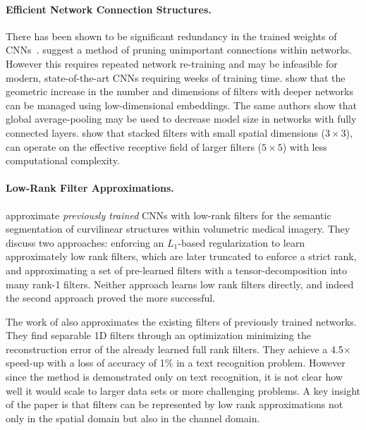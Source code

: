 \documentclass[thesis]{subfiles}
\begin{document}
    \paragraph{Efficient Network Connection Structures.}
    There has been shown to be significant redundancy in the trained weights of CNNs~\citep{Denil2013predicting}. \citet{lecun1989optimal} suggest a method of pruning unimportant connections within networks. However this requires repeated network re-training and may be infeasible for modern, state-of-the-art CNNs requiring weeks of training time. \citet{Lin2013NiN} show that the geometric increase in the number and dimensions of filters with deeper networks can be managed using low-dimensional embeddings. The same authors show that global average-pooling may be used to decrease model size in networks with fully connected layers. \citet{Simonyan2014verydeep} show that stacked filters with small spatial dimensions (\eg $3\times 3$), can operate on the effective receptive field of larger filters (\eg $5 \times 5$) with less computational complexity.
    
    \paragraph{Low-Rank Filter Approximations.}
    \label{approxmethods}
    \citet{conf/cvpr/RigamontiSLF13} approximate {\em previously trained} CNNs with low-rank filters for the semantic segmentation of curvilinear structures within volumetric medical imagery. They discuss two approaches: enforcing an $L_1$-based regularization to learn approximately low rank filters, which are later truncated to enforce a strict rank, and approximating a set of pre-learned filters with a tensor-decomposition into many rank-1 filters. Neither approach learns low rank filters directly, and indeed the second approach proved the more successful.
    
    The work of \citet{journals/corr/JaderbergVZ14} also approximates the existing filters of previously trained networks. They find separable 1D filters through an optimization minimizing the reconstruction error of the already learned full rank filters. They achieve a 4.5$\times$ speed-up with a loss of accuracy of 1\% in a text recognition problem. However since the method is demonstrated only on text recognition, it is not clear how well it would scale to larger data sets or more challenging problems. A key insight of the paper is that filters can be represented by low rank approximations not only in the spatial domain but also in the channel domain.
    
\end{document}
